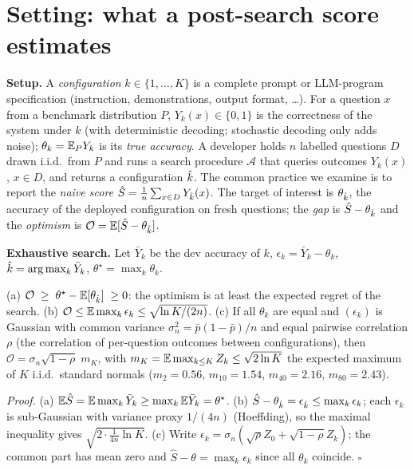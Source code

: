 \section{Setting: what a post-search score estimates}
\label{sec:setting}
\textbf{Setup.} A \emph{configuration} $k\in\{1,\dots,K\}$ is a complete prompt or LLM-program specification (instruction, demonstrations, output format, \dots). For a question $x$ from a benchmark distribution $P$, $Y_k(x)\in\{0,1\}$ is the correctness of the system under $k$ (with deterministic decoding; stochastic decoding only adds noise); $\theta_k=\mathbb{E}_P Y_k$ is its \emph{true accuracy}. A developer holds $n$ labelled questions $D$ drawn i.i.d.\ from $P$ and runs a search procedure $\mathcal A$ that queries outcomes $Y_k(x)$, $x\in D$, and returns a configuration $\hat k$. The common practice we examine is to report the \emph{naive score} $\hat S=\frac1n\sum_{x\in D}Y_{\hat k}(x)$. The target of interest is $\theta_{\hat k}$, the accuracy of the deployed configuration on fresh questions; the \emph{gap} is $\hat S-\theta_{\hat k}$ and the \emph{optimism} is $\mathcal O=\mathbb{E}[\hat S-\theta_{\hat k}]$.

\textbf{Exhaustive search.} Let $\bar Y_k$ be the dev accuracy of $k$, $\epsilon_k=\bar Y_k-\theta_k$, $\hat k=\arg\max_k\bar Y_k$, $\theta^\star=\max_k\theta_k$.
\begin{proposition}\label{prop:opt}
(a) $\mathcal O\;\ge\;\theta^\star-\mathbb{E}[\theta_{\hat k}]\;\ge 0$: the optimism is at least the expected regret of the search. (b) $\mathcal O\le \mathbb{E}\max_k\epsilon_k\le\sqrt{\ln K/(2n)}$. (c) If all $\theta_k$ are equal and $(\epsilon_k)$ is Gaussian with common variance $\sigma_n^2=\bar p(1-\bar p)/n$ and equal pairwise correlation $\rho$ (the correlation of per-question outcomes between configurations), then $\mathcal O=\sigma_n\sqrt{1-\rho}\;m_K$, with $m_K=\mathbb{E}\max_{k\le K}Z_k\le\sqrt{2\ln K}$ the expected maximum of $K$ i.i.d.\ standard normals ($m_{2}{=}0.56$, $m_{10}{=}1.54$, $m_{40}{=}2.16$, $m_{80}{=}2.43$).
\end{proposition}
\emph{Proof.} (a) $\mathbb{E}\hat S=\mathbb{E}\max_k\bar Y_k\ge\max_k\mathbb{E}\bar Y_k=\theta^\star$. (b) $\hat S-\theta_{\hat k}=\epsilon_{\hat k}\le\max_k\epsilon_k$; each $\epsilon_k$ is sub-Gaussian with variance proxy $1/(4n)$ (Hoeffding), so the maximal inequality gives $\sqrt{2\cdot\frac1{4n}\ln K}$. (c) Write $\epsilon_k=\sigma_n(\sqrt\rho Z_0+\sqrt{1-\rho}Z_k)$; the common part has mean zero and $\hat S - \theta = \max_k \epsilon_k$ since all $\theta_k$ coincide. $\square$

